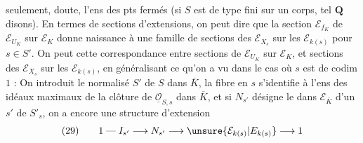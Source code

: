  seulement,  doute, l'ens des pts fermés (si $S$ est de type fini sur un corps, tel $\mathbf Q$ disons). En termes de sections d'extensions, on peut dire que la section $\mathcal E_{f_K}$ de $\mathcal E_{U_K}$ sur $\mathcal E_K$ donne naissance à une famille de sections des $\mathcal E_{X_s}$ sur les $\mathcal E_{k(s)}$ pour $s\in S'$. On peut    cette correspondance entre sections de $\mathcal E_{U_K}$ sur $\mathcal E_K$, et sections des $\mathcal E_{X_s}$ sur les $\mathcal E_{k(s)}$, en généralisant ce qu'on a vu dans le cas où $s$ est de codim $1$ : On introduit le normalisé $S'$ de $S$ dans $\overline K$, la fibre en $s$ s'identifie à l'ens des idéaux maximaux de la clôture  de $\underline{\mathcal O}_{S,s}$ dans $\overline K$, et si $N_{s'}$ désigne le   dans $\mathcal E_{\overline K}$ d'un $s'$ de $S'_s$, on a encore une structure d'extension
\[
(29)\qquad
1\mathrel{\text{---}}I_{s'}\longrightarrow N_{s'}\longrightarrow \unsure{\mathcal E_{k(s)}|E_{k(s)}}\longrightarrow 1
\]

